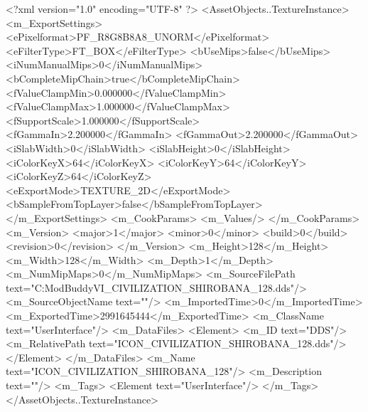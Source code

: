 <?xml version="1.0" encoding="UTF-8" ?>
<AssetObjects..TextureInstance>
	<m_ExportSettings>
		<ePixelformat>PF_R8G8B8A8_UNORM</ePixelformat>
		<eFilterType>FT_BOX</eFilterType>
		<bUseMips>false</bUseMips>
		<iNumManualMips>0</iNumManualMips>
		<bCompleteMipChain>true</bCompleteMipChain>
		<fValueClampMin>0.000000</fValueClampMin>
		<fValueClampMax>1.000000</fValueClampMax>
		<fSupportScale>1.000000</fSupportScale>
		<fGammaIn>2.200000</fGammaIn>
		<fGammaOut>2.200000</fGammaOut>
		<iSlabWidth>0</iSlabWidth>
		<iSlabHeight>0</iSlabHeight>
		<iColorKeyX>64</iColorKeyX>
		<iColorKeyY>64</iColorKeyY>
		<iColorKeyZ>64</iColorKeyZ>
		<eExportMode>TEXTURE_2D</eExportMode>
		<bSampleFromTopLayer>false</bSampleFromTopLayer>
	</m_ExportSettings>
	<m_CookParams>
		<m_Values/>
	</m_CookParams>
	<m_Version>
		<major>1</major>
		<minor>0</minor>
		<build>0</build>
		<revision>0</revision>
	</m_Version>
	<m_Height>128</m_Height>
	<m_Width>128</m_Width>
	<m_Depth>1</m_Depth>
	<m_NumMipMaps>0</m_NumMipMaps>
	<m_SourceFilePath text="C:\Users\asus\Documents\Firaxis ModBuddy\Civilization VI\temppic\ICON_CIVILIZATION_SHIROBANA_128.dds"/>
	<m_SourceObjectName text=""/>
	<m_ImportedTime>0</m_ImportedTime>
	<m_ExportedTime>2991645444</m_ExportedTime>
	<m_ClassName text="UserInterface"/>
	<m_DataFiles>
		<Element>
			<m_ID text="DDS"/>
			<m_RelativePath text="ICON_CIVILIZATION_SHIROBANA_128.dds"/>
		</Element>
	</m_DataFiles>
	<m_Name text="ICON_CIVILIZATION_SHIROBANA_128"/>
	<m_Description text=""/>
	<m_Tags>
		<Element text="UserInterface"/>
	</m_Tags>
</AssetObjects..TextureInstance>

